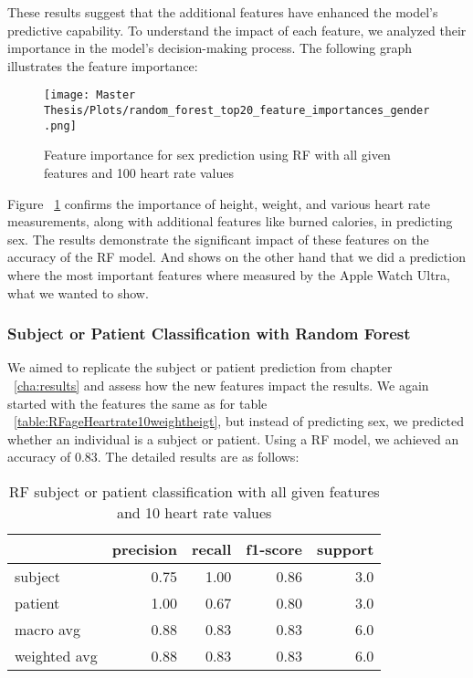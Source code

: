 These results suggest that the additional features have enhanced the model's predictive capability. To understand the impact of each feature, we analyzed their importance in the model's decision-making process. The following graph illustrates the feature importance:
\FloatBarrier
\begin{figure}[h!]
    \centering
    \texttt{[image: Master Thesis/Plots/random\_forest\_top20\_feature\_importances\_gender.png]}
        \caption{Feature importance for sex prediction using RF with all given features and 100 heart rate values}
    \label{fig:featureimportanceRFsex100}
\end{figure}
\FloatBarrier

Figure ~\ref{fig:featureimportanceRFsex100} confirms the importance of height, weight, and various heart rate measurements, along with additional features like burned calories, in predicting sex. The results demonstrate the significant impact of these features on the accuracy of the RF model. And shows on the other hand that we did a prediction where the most important features where measured by the Apple Watch Ultra, what we wanted to show.

\subsubsection{Subject or Patient Classification with Random Forest}

We aimed to replicate the subject or patient prediction from chapter ~\ref{cha:results} and assess how the new features impact the results. We again started with the features the same as for table ~\ref{table:RFageHeartrate10weightheigt}, but instead of predicting sex, we predicted whether an individual is a subject or patient. Using a RF model, we achieved an accuracy of 0.83. The detailed results are as follows:

\begin{table}[H]
\centering
\begin{tabular}{lrrrr}
\toprule
{} &  precision &    recall &  f1-score &   support \\
\midrule
subject      &   0.75 &  1.00 &  0.86 &  3.0 \\
patient      &   1.00 &  0.67 &  0.80 &  3.0 \\
macro avg    &   0.88 &  0.83 &  0.83 &  6.0 \\
weighted avg &   0.88 &  0.83 &  0.83 &  6.0 \\
\bottomrule
\end{tabular}
\caption{RF subject or patient classification with all given features and 10 heart rate values}
\label{table:featureimportanceRFsubpat10}
\end{table}

